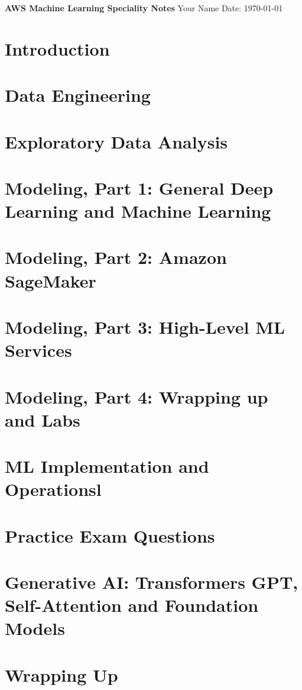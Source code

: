\documentclass[11pt]{book}
\begin{document}
    \begin{titlepage}
        \centering
        \vspace*{2in}
        \Huge \textbf{AWS Machine Learning Speciality Notes}
        \vfill
        \Large Your Name
        \vfill
        \Large Date: \today
    \end{titlepage}

    \newpage

    \tableofcontents
    \newpage


    \chapter{Introduction}


    \chapter{Data Engineering}


    \chapter{Exploratory Data Analysis}


    \chapter{Modeling, Part 1: General Deep Learning and Machine Learning}


    \chapter{Modeling, Part 2: Amazon SageMaker}


    \chapter{Modeling, Part 3: High-Level ML Services}


    \chapter{Modeling, Part 4: Wrapping up and Labs}


    \chapter{ML Implementation and Operationsl}


    \chapter{Practice Exam Questions}


    \chapter{Generative AI: Transformers GPT, Self-Attention and Foundation Models}


    \chapter{Wrapping Up}
\end{document}
